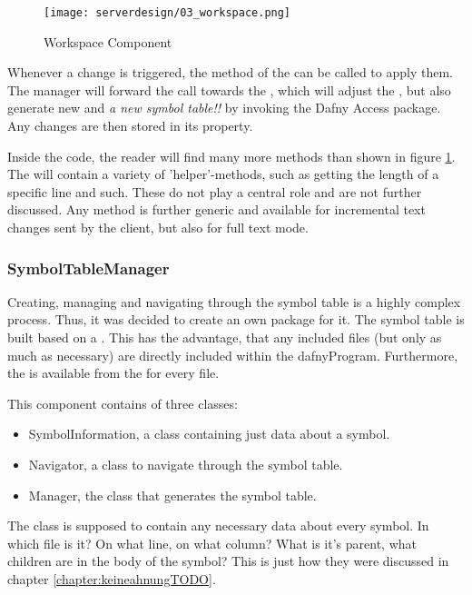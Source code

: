 \begin{figure}[H]
    \centering
    \texttt{[image: serverdesign/03\_workspace.png]}
    \caption{Workspace Component}
    \label{fig:server_workspace}
\end{figure}

Whenever a change is triggered, the  method of the  can be called to apply them. The manager will forward the call towards the , which will adjust the , but also generate new  and \textit{a new symbol table!!} by invoking the Dafny Access package. Any changes are then stored in its  property.

Inside the code, the reader will find many more methods than shown in figure \ref{fig:server_workspace}. The  will contain a variety of 'helper'-methods, such as getting the length of a specific line and such. These do not play a central role and are not further discussed. Any  method is further generic and available for incremental text changes sent by the client, but also for full text mode.

\subsubsection{SymbolTableManager}
Creating, managing and navigating through the symbol table is a highly complex process. Thus, it was decided to create an own package for it. The symbol table is built based on a . This has the advantage, that any included files (but only as much as necessary) are directly included within the dafnyProgram. Furthermore, the  is available from the  for every file.

This component contains of three classes:
\begin{itemize}
    \item SymbolInformation, a class containing just data about a symbol. 
    \item Navigator, a class to navigate through the symbol table.
    \item Manager, the class that generates the symbol table.
\end{itemize}

The  class is supposed to contain any necessary data about every symbol. In which file is it? On what line, on what column? What is it's parent, what children are in the body of the symbol? This is just how they were discussed in chapter \ref{chapter:keineahnungTODO}. 

